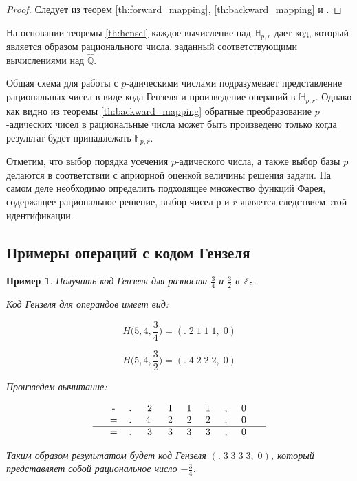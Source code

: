 \documentclass[master, och, diploma, times]{sty/SCWorks}
\theoremstyle{plain}
\newtheorem{exmp}{Пример}[section]
\theoremstyle{definition}
\numberwithin{equation}{section}
\begin{document}
\begin{proof} 
Следует из теорем \ref{th:forward_mapping}, \ref{th:backward_mapping} и \cite{bib:numbers:krishnamurthy}.
\end{proof}

На основании теоремы \ref{th:hensel} каждое вычисление над $\mathbb{H}_{p,r}$ дает код, который является образом рационального числа, заданный соответствующими вычислениями над $\hat{\mathbb{Q}}$.


Общая схема для работы с $p$-адическими числами подразумевает представление рациональных чисел в виде кода Гензеля и произведение операций в $\mathbb{H}_{p,r}$. Однако как видно из теоремы \ref{th:backward_mapping} обратные преобразование $p$-адических чисел в рациональные числа может быть произведено только когда результат будет принадлежать $\mathbb{F}_{p,r}$.

Отметим, что выбор порядка усечения $p$-адического числа, а также выбор базы $p$ делаются в соответствии с априорной оценкой величины решения задачи. На самом деле необходимо определить подходящее множество функций Фарея, содержащее рациональное решение, выбор чисел $р$ и $r$ является следствием этой идентификации.

\subsection{Примеры операций с кодом Гензеля}

\begin{exmp}
Получить код Гензеля для разности $\frac{3}{4}$ и $\frac{3}{2}$ в $\mathbb{Z}_5$.

\noindent Код Гензеля для операндов имеет вид:

$$H\bigg(5,4, \frac{3}{4}\bigg)=(.\; 2\; 1\; 1\; 1,\; 0)$$

$$H\bigg(5,4, \frac{3}{2}\bigg)=(.\; 4\; 2\; 2\; 2,\; 0)$$


\noindent Произведем вычитание:

$$
\begin{tabular}{ccccccccccc}
& - & .\; & 2\; & 1\; & 1\; & 1\; & ,\; & 0\; &  \\
& = & .\; & 4 \; & 2\; & 2\; & 2\; & ,\; & 0\; &  \\
\hline
& = & .\; & 3\; & 3\; & 3\; & 3\; & ,\; & 0\; &
\end{tabular}
$$


\noindent Таким образом результатом будет код Гензеля $(.\; 3\; 3\; 3\; 3,\; 0)$, который представляет собой рациональное число $-\frac{3}{4}$.
\end{exmp}
\end{document}
